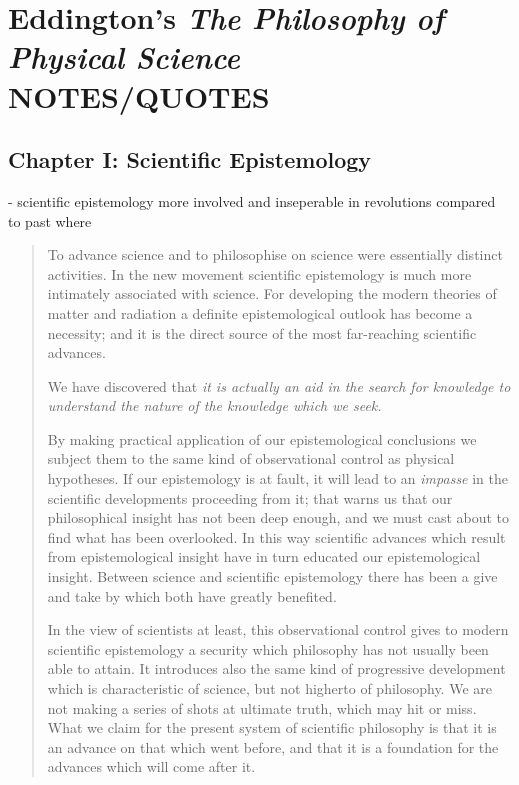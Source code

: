 
\section{Eddington's \emph{The Philosophy of Physical Science} NOTES/QUOTES}

\subsection{Chapter I: Scientific Epistemology}

- scientific epistemology more involved and inseperable in revolutions compared to past where 

\begin{quote}
    To advance science and to philosophise on science were essentially distinct activities. In the new movement scientific epistemology is much more intimately associated with science.  For developing the modern theories of matter and radiation a definite epistemological outlook has become a necessity; and it is the direct source of the most far-reaching scientific advances.
    
    We have discovered that \emph{it is actually an aid in the search for knowledge to understand the nature of the knowledge which we seek.}
    
    By making practical application of our epistemological conclusions we subject them to the same kind of observational control as physical hypotheses.  If our epistemology is at fault, it will lead to an \emph{impasse} in the scientific developments proceeding from it; that warns us that our philosophical insight has not been deep enough, and we must cast about to find what has been overlooked.  In this way scientific advances which result from epistemological insight have in turn educated our epistemological insight.  Between science and scientific epistemology there has been a give and take by which both have greatly benefited.
    
    In the view of scientists at least, this observational control gives to modern scientific epistemology a security which philosophy has not usually been able to attain.  It introduces also the same kind of progressive development which is characteristic of science, but not higherto of philosophy.  We are not making a series of shots at ultimate truth, which may hit or miss.  What we claim for the present system of scientific philosophy is that it is an advance on that which went before, and that it is a foundation for the advances which will come after it.
    
    \citep[p. 5]{Eddington1939}
\end{quote}

